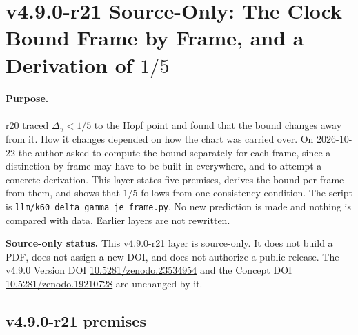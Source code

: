 \clearpage
\section*{v4.9.0-r21 Source-Only: The Clock Bound Frame by Frame, and a Derivation of \texorpdfstring{\(1/5\)}{1/5}}
\label{sec:v490-r21-clock-bound-per-frame}

\paragraph{Purpose.}
r20 traced \(\Delta_\gamma<1/5\) to the Hopf point and found that the bound changes away from it.  How it changes depended on
how the chart was carried over.  On 2026-10-22 the author asked to compute the bound separately for each frame, since a
distinction by frame may have to be built in everywhere, and to attempt a concrete derivation.  This layer states five
premises, derives the bound per frame from them, and shows that \(1/5\) follows from one consistency condition.  The script is
\texttt{llm/k60\_delta\_gamma\_je\_frame.py}.  No new prediction is made and nothing is compared with data.  Earlier layers are
not rewritten.

\noindent\textbf{Source-only status.}
This v4.9.0-r21 layer is source-only.  It does not build a PDF, does not assign a new DOI,
and does not authorize a public release.  The v4.9.0 Version DOI
\href{https://doi.org/10.5281/zenodo.23534954}{10.5281/zenodo.23534954} and the Concept DOI
\href{https://doi.org/10.5281/zenodo.19210728}{10.5281/zenodo.19210728} are unchanged by it.

\subsection*{v4.9.0-r21 premises}
\label{subsec:v490-r21-premises}

